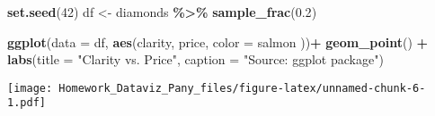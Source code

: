 \documentclass[
]{article}
\newenvironment{Shaded}{\begin{snugshade}}{\end{snugshade}}
\newcommand{\AttributeTok}[1]{\textcolor[rgb]{0.13,0.29,0.53}{#1}}
\newcommand{\DecValTok}[1]{\textcolor[rgb]{0.00,0.00,0.81}{#1}}
\newcommand{\FloatTok}[1]{\textcolor[rgb]{0.00,0.00,0.81}{#1}}
\newcommand{\FunctionTok}[1]{\textcolor[rgb]{0.13,0.29,0.53}{\textbf{#1}}}
\newcommand{\NormalTok}[1]{#1}
\newcommand{\OtherTok}[1]{\textcolor[rgb]{0.56,0.35,0.01}{#1}}
\newcommand{\SpecialCharTok}[1]{\textcolor[rgb]{0.81,0.36,0.00}{\textbf{#1}}}
\newcommand{\StringTok}[1]{\textcolor[rgb]{0.31,0.60,0.02}{#1}}
\begin{document}
\begin{Shaded}
\begin{Highlighting}[]
\FunctionTok{set.seed}\NormalTok{(}\DecValTok{42}\NormalTok{)}
\NormalTok{df }\OtherTok{\textless{}{-}}\NormalTok{ diamonds }\SpecialCharTok{\%\textgreater{}\%}
  \FunctionTok{sample\_frac}\NormalTok{(}\FloatTok{0.2}\NormalTok{)}

\FunctionTok{ggplot}\NormalTok{(}\AttributeTok{data =}\NormalTok{ df, }
       \FunctionTok{aes}\NormalTok{(clarity, price, }\AttributeTok{color =} \StringTok{\textquotesingle{}salmon\textquotesingle{}}\NormalTok{ ))}\SpecialCharTok{+} 
       \FunctionTok{geom\_point}\NormalTok{() }\SpecialCharTok{+}
       \FunctionTok{labs}\NormalTok{(}\AttributeTok{title =} \StringTok{"Clarity vs. Price"}\NormalTok{,}
            \AttributeTok{caption =} \StringTok{"Source: ggplot package"}\NormalTok{)  }
\end{Highlighting}
\end{Shaded}

\texttt{[image: Homework\_Dataviz\_Pany\_files/figure-latex/unnamed-chunk-6-1.pdf]}
\end{document}
